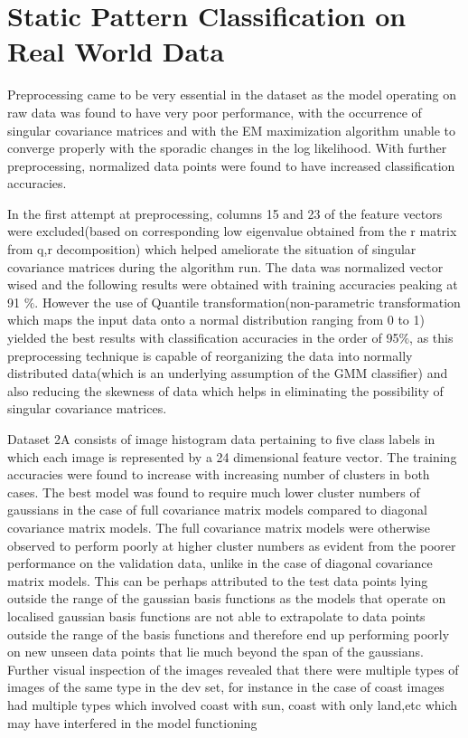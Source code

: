 \section{Static Pattern Classification on Real World Data}

Preprocessing came to be very essential in the dataset as the model operating on raw data was found to have very poor performance, with the occurrence of singular covariance matrices and with the EM maximization algorithm unable to converge properly with the sporadic changes in the log
likelihood. With further preprocessing, normalized data points were found to have increased classification accuracies. 

In the first attempt at preprocessing, columns 15 and 23 of the feature vectors were excluded(based on corresponding low eigenvalue obtained from the r matrix from q,r decomposition) which helped ameliorate the situation of singular covariance matrices during the algorithm run. The data was normalized vector wised and the following results were obtained with training accuracies peaking at 91 $\%$. However the use of Quantile transformation(non-parametric transformation which maps the input data onto a normal distribution ranging from 0 to 1) yielded the best results with classification accuracies in the order of 95$\%$, as this preprocessing technique is capable of reorganizing the data into normally distributed data(which is an underlying assumption of the GMM classifier) and also reducing the skewness of data which helps in eliminating the possibility of singular covariance matrices.


Dataset 2A consists of image histogram data pertaining to five class labels in which each image is represented by a 24 dimensional feature vector. The training accuracies were found to increase with increasing number of clusters in both cases. The best model was found to require much lower cluster numbers of gaussians in the case of full covariance matrix models compared to diagonal covariance matrix models. The full covariance matrix models were otherwise observed to perform poorly at higher cluster numbers as evident from the poorer performance on the validation data, unlike in the case of diagonal covariance matrix models. This can be perhaps attributed to the test data points lying outside the range of the gaussian basis functions as the models that operate on localised gaussian basis functions are not able to extrapolate to data points outside the range of the basis functions and therefore end up performing poorly on new unseen data points that lie much beyond the span of the gaussians. Further visual inspection of the images revealed that there were multiple types of images of the same type in the dev set, for instance in the case of coast images had multiple types which involved coast with sun, coast with only land,etc which may have interfered in the model functioning




